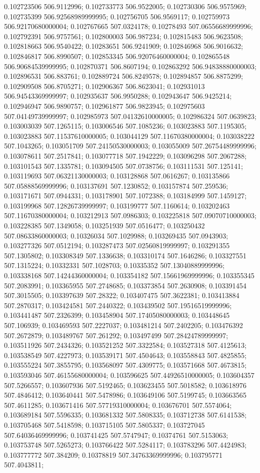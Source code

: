 0.102723506 506.9112996; 0.102733773 506.9522005; 0.102730306 506.9575969; 0.102735399 506.92568989999995; 0.102756705 506.9569117; 0.102759973 506.92170680000004; 0.102767665 507.0324178; 0.10278493 507.06556689999996; 0.102792391 506.9757561; 0.102800003 506.987234; 0.102815483 506.9623508; 0.102818663 506.9540422; 0.10283651 506.9241909; 0.102846968 506.9016632; 0.102846817 506.8990507; 0.102853345 506.92076460000004; 0.102865548 506.90684539999995; 0.102870371 506.8607194; 0.102863292 506.94838880000003; 0.102896531 506.883761; 0.102889724 506.8249578; 0.102894857 506.8875299; 0.102909508 506.8705271; 0.102906367 506.8623041; 0.102931013 506.94543369999997; 0.102935637 506.9950288; 0.102943647 506.9425214; 0.102946947 506.9890757; 0.102961877 506.9823945; 0.102975603 507.04149739999997; 0.102985973 507.04132610000005; 0.102986324 507.0639823; 0.103003039 507.1265115; 0.103006546 507.1085236; 0.103023883 507.1195305; 0.103023883 507.11537610000005; 0.103044129 507.11670380000004; 0.103038222 507.1043265; 0.103051709 507.24150530000003; 0.103055009 507.26754489999996; 0.103078611 507.2517841; 0.103077718 507.1942229; 0.103096298 507.2067288; 0.103101543 507.1335781; 0.103094505 507.0738756; 0.103111531 507.125141; 0.103119693 507.06321130000003; 0.103128868 507.0616267; 0.103135866 507.05888569999996; 0.103137691 507.1230852; 0.103157874 507.259536; 0.103171671 507.0944331; 0.103178901 507.1072388; 0.103184999 507.1459127; 0.103199968 507.12826739999997; 0.103199777 507.1160614; 0.103202463 507.11670380000004; 0.103212913 507.0986303; 0.103225818 507.09070710000003; 0.103228385 507.1349058; 0.103251939 507.0516477; 0.103250432 507.08633860000003; 0.10326034 507.1029988; 0.103269435 507.0943903; 0.103277326 507.0512194; 0.103287473 507.02560819999997; 0.103291355 507.1305802; 0.103308349 507.1336638; 0.103310174 507.1646286; 0.103327551 507.1315224; 0.10332331 507.1028703; 0.10335352 507.13040889999996; 0.103338168 507.14244360000004; 0.103354182 507.15661969999996; 0.103355345 507.2083991; 0.103365955 507.2748685; 0.103373854 507.2630908; 0.103391454 507.3015505; 0.103397639 507.28322; 0.103407475 507.3622381; 0.103413884 507.2870317; 0.103424581 507.2440322; 0.103439502 507.19516519999996; 0.103441487 507.2326399; 0.103458904 507.17405080000003; 0.103448645 507.106939; 0.103469593 507.2227037; 0.103481214 507.2402205; 0.103476392 507.2672879; 0.103489767 507.261292; 0.103497499 507.28424789999997; 0.103511926 507.2434326; 0.103521252 507.3322584; 0.103527318 507.4125613; 0.103538549 507.4227973; 0.103539171 507.4504643; 0.103558843 507.4825855; 0.103555224 507.3855795; 0.103568097 507.4309775; 0.103571668 507.4673815; 0.103593046 507.46155680000004; 0.103596625 507.44926510000005; 0.103604357 507.5266557; 0.103607936 507.5192465; 0.103623455 507.5018582; 0.103618976 507.4846412; 0.103640441 507.5478986; 0.103649106 507.5199745; 0.103663565 507.4611285; 0.103671416 507.57719310000004; 0.103676701 507.5574064; 0.103689184 507.5596335; 0.103681332 507.5808335; 0.103712738 507.6141538; 0.103705468 507.5418598; 0.103715105 507.5805337; 0.103727045 507.64036469999996; 0.103741425 507.5747947; 0.10374761 507.5153063; 0.103753748 507.5265273; 0.103766422 507.5284117; 0.103783296 507.4424983; 0.103777772 507.384209; 0.10378819 507.34763369999996; 0.103795771 507.4043811; 
